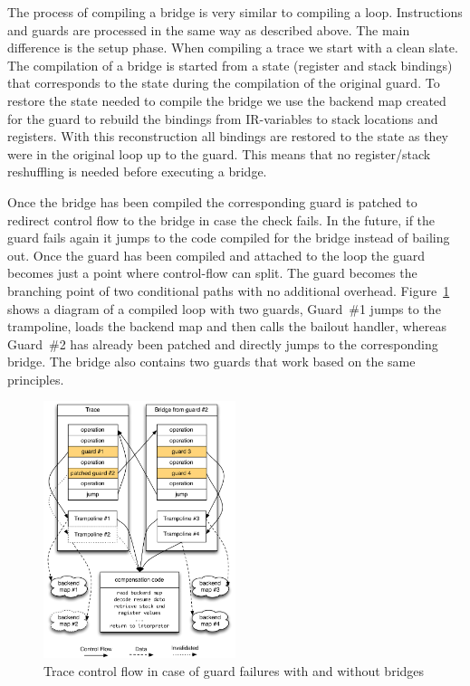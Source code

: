 \documentclass[letter,10pt]{sigplanconf}
\begin{document}
The process of compiling a bridge is very similar to compiling a loop.
Instructions and guards are processed in the same way as described above. The
main difference is the setup phase. When compiling a trace we start with a clean
slate. The compilation of a bridge is started from a state (register and stack
bindings) that corresponds to the state during the compilation of the original
guard. To restore the state needed to compile the bridge we use the backend map
created for the guard to rebuild the bindings from IR-variables
to stack locations and registers.  With this
reconstruction all bindings are restored to the state as they were in the
original loop up to the guard. This means that no register/stack reshuffling is
needed before executing a bridge.

Once the bridge has been compiled the corresponding guard is
patched to redirect control flow to the bridge in case the check fails. In
the future, if the guard fails again it jumps to the code compiled for the bridge
instead of bailing out. Once the guard has been compiled and attached to the
loop the guard becomes just a point where control-flow can split.
The guard becomes the branching point of two conditional paths with no
additional overhead.
Figure~\ref{fig:trampoline} shows a diagram of a compiled loop with two guards,
Guard~\#1 jumps to the trampoline, loads the backend map and
then calls the bailout handler, whereas Guard~\#2 has already been patched
and directly jumps to the corresponding bridge. The bridge also contains two
guards that work based on the same principles.
\begin{figure}
\centering
\includegraphics[width=0.5\textwidth]{figures/loop_bridge}
\caption{Trace control flow in case of guard failures with and without bridges}
\label{fig:trampoline}
\end{figure}
\end{document}
